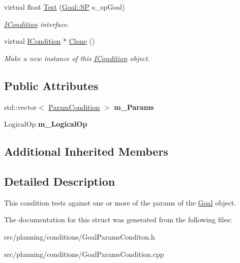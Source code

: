 \begin{DoxyCompactItemize}
\item 
\mbox{\label{struct_goal_params_condition_a125b15ce9cee3898a7fe10e4af48c92b}} 
virtual float \hyperlink{struct_goal_params_condition_a125b15ce9cee3898a7fe10e4af48c92b}{Test} (\hyperlink{class_goal_a818ae12a4d1f28bd433dab2a830a390e}{Goal\+::\+SP} a\+\_\+sp\+Goal)
\begin{DoxyCompactList}\small\item\em \hyperlink{class_i_condition}{I\+Condition} interface. \end{DoxyCompactList}\item 
\mbox{\label{struct_goal_params_condition_a6566267768ced522a57ec3c44e5f4bca}} 
virtual \hyperlink{class_i_condition}{I\+Condition} $\ast$ \hyperlink{struct_goal_params_condition_a6566267768ced522a57ec3c44e5f4bca}{Clone} ()
\begin{DoxyCompactList}\small\item\em Make a new instance of this \hyperlink{class_i_condition}{I\+Condition} object. \end{DoxyCompactList}\end{DoxyCompactItemize}
\subsection*{Public Attributes}
\begin{DoxyCompactItemize}
\item 
\mbox{\label{struct_goal_params_condition_a20b92bbd7f7cd8846cc05e35eff8aac9}} 
std\+::vector$<$ \hyperlink{struct_goal_params_condition_1_1_param_condition}{Param\+Condition} $>$ {\bfseries m\+\_\+\+Params}
\item 
\mbox{\label{struct_goal_params_condition_a67988805f966c140543ee54833e804b0}} 
Logical\+Op {\bfseries m\+\_\+\+Logical\+Op}
\end{DoxyCompactItemize}
\subsection*{Additional Inherited Members}


\subsection{Detailed Description}
This condition tests against one or more of the params of the \hyperlink{class_goal}{Goal} object. 

The documentation for this struct was generated from the following files\+:\begin{DoxyCompactItemize}
\item 
src/planning/conditions/Goal\+Params\+Conditon.\+h\item 
src/planning/conditions/Goal\+Params\+Condition.\+cpp\end{DoxyCompactItemize}
